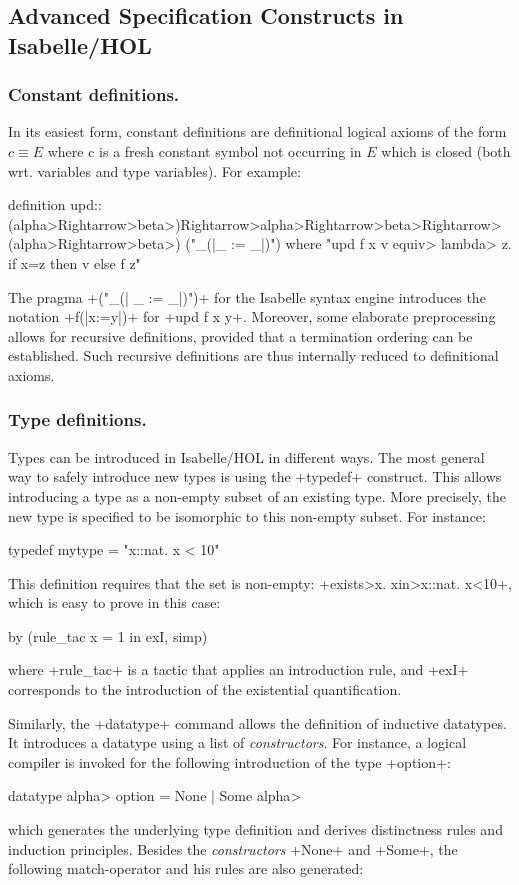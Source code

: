 \documentclass[11pt,a4paper]{article}
\begin{document}
\subsection{Advanced Specification Constructs in Isabelle/HOL}
\label{Subsection:advconstructs}
\subsubsection{Constant definitions.} In its easiest form, constant definitions
are definitional logical axioms of the form $c \equiv E$ where c is a fresh
constant symbol not occurring in $E$ which is closed (both wrt. variables
and type variables). For example:
\begin{isar}
definition upd::(\<alpha>\<Rightarrow>\<beta>)\<Rightarrow>\<alpha>\<Rightarrow>\<beta>\<Rightarrow>(\<alpha>\<Rightarrow>\<beta>)         ("_(|_ := _|)")
where       "upd f x v \<equiv>   \<lambda> z. if x=z then v else f z"
\end{isar}
The pragma \inlineisar+("_(| _ := _|)")+ for the Isabelle syntax engine introduces the
notation \inlineisar+f(|x:=y|)+ for \inlineisar+upd f x y+.
Moreover, some elaborate preprocessing allows for recursive
definitions, provided that a termination ordering can be established. Such recursive 
definitions are thus internally reduced to definitional axioms.

\subsubsection{Type definitions.} Types can be introduced in Isabelle/HOL 
in different ways. 
The most general way to safely introduce new types is 
 using the \inlineisar+typedef+ construct. This allows 
introducing a type as a non-empty subset of an existing type. More
precisely, the new type is specified to be isomorphic to this
non-empty subset. For instance:
\begin{isar}
 typedef mytype = "{x::nat. x < 10}"
\end{isar}
This definition requires that the set is non-empty:
\inlineisar+\<exists>x. x\<in>{x::nat. x<10}+, which is 
easy to prove in this case:
\begin{isar}
 by (rule_tac x = 1 in exI, simp)
\end{isar}
where \inlineisar+rule_tac+ is a tactic that applies an introduction rule, and \inlineisar+exI+ corresponds to the introduction of the existential quantification.


Similarly, the \inlineisar+datatype+ command allows the definition of
inductive datatypes. It introduces a datatype using a list
of \emph{constructors}. For instance, a logical compiler is invoked for the
following introduction of the type \inlineisar+option+:
\begin{isar}
 datatype \<alpha>  option   = None | Some \<alpha>
\end{isar}
which generates the underlying type definition and derives distinctness rules and induction
principles. Besides the \emph{constructors}
\inlineisar+None+ and \inlineisar+Some+, the following match-operator and his rules are also generated:
\end{document}
